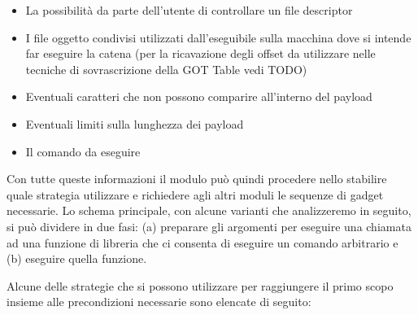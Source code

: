 \begin{itemize}
  \item La possibilità da parte dell'utente di controllare un file
    descriptor

  \item I file oggetto condivisi utilizzati dall'eseguibile sulla
    macchina dove si intende far eseguire la catena (per la
    ricavazione degli offset da utilizzare nelle tecniche di
    sovrascrizione della GOT Table vedi TODO)

  \item Eventuali caratteri che non possono comparire all'interno del
    payload

  \item Eventuali limiti sulla lunghezza dei payload

  \item Il comando da eseguire

\end{itemize}

Con tutte queste informazioni il modulo può quindi procedere nello
stabilire quale strategia utilizzare e richiedere agli altri moduli le
sequenze di gadget necessarie. Lo schema principale, con alcune varianti
che analizzeremo in seguito, si può dividere in due fasi: (a)
preparare gli argomenti per eseguire una chiamata ad una funzione di
libreria che ci consenta di eseguire un comando arbitrario e (b)
eseguire quella funzione.

Alcune delle strategie che si possono utilizzare per raggiungere il
primo scopo insieme alle precondizioni necessarie sono elencate di
seguito:

